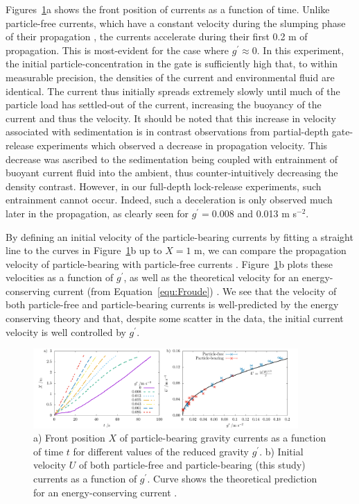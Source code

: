 \documentclass[authoryear,preprint,review,12pt]{elsarticle}
\begin{document}
Figures~\ref{fig:posVel}a shows the front position of currents as a function of time. Unlike particle-free currents, which have a constant velocity during the slumping phase of their propagation \citep{Huppert80, Jarvis21}, the currents accelerate during their first 0.2 m of propagation. This is most-evident for the case where $g^{\prime} \approx 0$. In this experiment, the initial particle-concentration in the gate is sufficiently high that, to within measurable precision, the densities of the current and environmental fluid are identical. The current thus initially spreads extremely slowly until much of the particle load has settled-out of the current, increasing the buoyancy of the current and thus the velocity. It should be noted that this increase in velocity associated with sedimentation is in contrast observations from partial-depth gate-release experiments \citep{Maxworthy99, Sutherland18, Jazi19} which observed a decrease in propagation velocity. This decrease was ascribed to the sedimentation being coupled with entrainment of buoyant current fluid into the ambient, thus counter-intuitively decreasing the density contrast. However, in our full-depth lock-release experiments, such entrainment cannot occur. Indeed, such a deceleration is only observed much later in the propagation, as clearly seen for $g^{\prime} = 0.008 $ and 0.013 m s$^{-2}$.

By defining an initial velocity of the particle-bearing currents by fitting a straight line to the curves in Figure~\ref{fig:posVel}b up to $X = 1$ m, we can compare the propagation velocity of particle-bearing with particle-free currents \citep{Jarvis21}. Figure~\ref{fig:posVel}b plots these velocities as a function of $g^{\prime}$, as well as the theoretical velocity for an energy-conserving current (from Equation~\ref{equ:Froude}) \citep{Benjamin68}. We see that the velocity of both particle-free and particle-bearing currents is well-predicted by the energy conserving theory and that, despite some scatter in the data, the initial current velocity is well controlled by $g^{\prime}$. 


\begin{figure}[ht!]
  \centerline{\includegraphics[width=0.9\textwidth]{unsieved_pub2.pdf}}
  \caption{a) Front position $X$ of particle-bearing gravity currents as a function of time $t$ for different values of the reduced gravity $g^{\prime}$. b) Initial velocity $U$ of both particle-free \citep{Jarvis21} and particle-bearing (this study) currents as a function of $g^{\prime}$. Curve shows the theoretical prediction for an energy-conserving current \citep{Benjamin68}.}
  \label{fig:posVel}
\end{figure}
\end{document}
